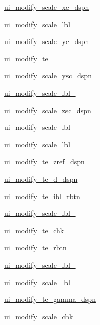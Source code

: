 \begin{DoxyCompactItemize}
\hyperlink{a00074_ae36e5bd681ee713671843137c9328bc6}{ui\+\_\+modify\+\_\+scale\+\_\+xc\+\_\+dspn}
\item 
\hyperlink{a00074_a69a6abf1b7b08db89a7a0f640590d037}{ui\+\_\+modify\+\_\+scale\+\_\+lbl\+\_}
\item 
\hyperlink{a00074_a66b3b327058352a8f531970b3e41bf6f}{ui\+\_\+modify\+\_\+scale\+\_\+yc\+\_\+dspn}
\item 
\hyperlink{a00074_aefc951ed87303c4d5f2a3c5801b17441}{ui\+\_\+modify\+\_\+te}
\item 
\hyperlink{a00074_a537018812c327e8613e8e2cbb8923210}{ui\+\_\+modify\+\_\+scale\+\_\+ysc\+\_\+dspn}
\item 
\hyperlink{a00074_a1a6eb9e8e59a9972b679b8270ff4bea1}{ui\+\_\+modify\+\_\+scale\+\_\+lbl\+\_}
\item 
\hyperlink{a00074_a76bb270b0589229eacf6687c07bf272f}{ui\+\_\+modify\+\_\+scale\+\_\+zsc\+\_\+dspn}
\item 
\hyperlink{a00074_a7c6419f1965f509d4d20b44ff79532a1}{ui\+\_\+modify\+\_\+scale\+\_\+lbl\+\_}
\item 
\hyperlink{a00074_aecf422c1e4f941282d62bf55d8de6016}{ui\+\_\+modify\+\_\+scale\+\_\+lbl\+\_}
\item 
\hyperlink{a00074_a04cb27f2d567ce561060ea7bc0dcc312}{ui\+\_\+modify\+\_\+te\+\_\+zref\+\_\+dspn}
\item 
\hyperlink{a00074_a9ca32fc9e8c10281b8b6be63492f908f}{ui\+\_\+modify\+\_\+te\+\_\+d\+\_\+dspn}
\item 
\hyperlink{a00074_a8f00caffccc70495f4e0625726ecf065}{ui\+\_\+modify\+\_\+te\+\_\+ibl\+\_\+rbtn}
\item 
\hyperlink{a00074_a95b42e73e6c5583e906d94cb5e9584da}{ui\+\_\+modify\+\_\+scale\+\_\+lbl\+\_}
\item 
\hyperlink{a00074_a193502da000d9cf37d3b7df405ae041d}{ui\+\_\+modify\+\_\+te\+\_\+chk}
\item 
\hyperlink{a00074_a917946a3e24c4730fcba027707053366}{ui\+\_\+modify\+\_\+te\+\_\+rbtn}
\item 
\hyperlink{a00074_a808a2e4eb7a38a7dd48b2a18fb6fdb15}{ui\+\_\+modify\+\_\+scale\+\_\+lbl\+\_}
\item 
\hyperlink{a00074_a3dbb0c29625945b91f6031c0d63a4b0a}{ui\+\_\+modify\+\_\+scale\+\_\+lbl\+\_}
\item 
\hyperlink{a00074_a4ca63b2a637cf38364b19f24c8285b50}{ui\+\_\+modify\+\_\+te\+\_\+gamma\+\_\+dspn}
\item 
\hyperlink{a00074_a8223e458d886d632e1e32eebe1660ccd}{ui\+\_\+modify\+\_\+scale\+\_\+chk}

\end{DoxyCompactItemize}
